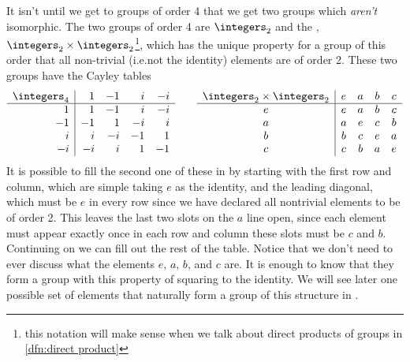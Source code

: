 \documentclass[fleqn]{NotesClass}
\begin{document}
    It isn't until we get to groups of order 4 that we get two groups which \emph{aren't} isomorphic.
    The two groups of order 4 are \(\integers_2\) and the , \(\integers_2 \times \integers_2\)\footnote{this notation will make sense when we talk about direct products of groups in \cref{dfn:direct product}}, %
    which has the unique property for a group of this order that all non-trivial (i.e.\@ not the identity) elements are of order 2.
    These two groups have the Cayley tables
    \begin{equation}\label{eqn:cayley tables groups of order 4}
        \begin{array}{r|rrrr}
            \integers_4 & 1  & -1 & i  & -i \\ \hline
            1           & 1  & -1 & i  & -i \\
            -1          & -1 & 1  & -i & i  \\
            i           & i  & -i & -1 & 1  \\
            -i          & -i & i  & 1  & -1 
        \end{array}
        \qquad
        \begin{array}{c|cccc}
            \integers_2 \times \integers_2 & e & a & b & c \\ \hline
            e                              & e & a & b & c \\
            a                              & a & e & c & b \\
            b                              & b & c & e & a \\
            c                              & c & b & a & e
        \end{array}
    \end{equation}
    It is possible to fill the second one of these in by starting with the first row and column, which are simple taking \(e\) as the identity, and the leading diagonal, which must be \(e\) in every row since we have declared all nontrivial elements to be of order 2.
    This leaves the last two slots on the \(a\) line open, since each element must appear exactly once in each row and column these slots must be \(c\) and \(b\).
    Continuing on we can fill out the rest of the table.
    Notice that we don't need to ever discuss what the elements \(e\), \(a\), \(b\), and \(c\) are.
    It is enough to know that they form a group with this property of squaring to the identity.
    We will see later one possible set of elements that naturally form a group of this structure in . %
    
\end{document}
